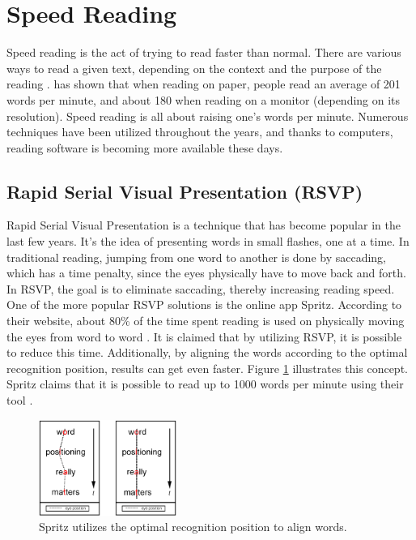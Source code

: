 \section{\fontsize{12}{15}\selectfont Speed Reading}
Speed reading is the act of trying to read faster than normal. There are various ways to read a given text, depending on the context and the purpose of the reading \cite{differentWaysOfReading}.  has shown that when reading on paper, people read an average of 201 words per minute, and about 180 when reading on a monitor (depending on its resolution). Speed reading is all about raising one's words per minute. Numerous techniques have been utilized throughout the years, and  thanks to computers, reading software is becoming more available these days.


\subsection{Rapid Serial Visual Presentation (RSVP)}
Rapid Serial Visual Presentation is a technique that has become popular in the last few years. It's the idea of presenting words in small flashes, one at a time. In traditional reading, jumping from one word to another is done by saccading, which has a time penalty, since the eyes physically have to move back and forth. In RSVP, the goal is to eliminate saccading, thereby increasing reading speed. One of the more popular RSVP solutions is the online app Spritz. According to their website, about 80\% of the time spent reading is used on physically moving the eyes from word to word \cite{spritz}.	It is claimed that by utilizing RSVP, it is possible to reduce this time. Additionally, by aligning the words according to the optimal recognition position, results can get even faster. Figure \ref{fig:spritz_orp} illustrates this concept. Spritz claims that it is possible to read up to 1000 words per minute using their tool \cite{spritz}.

\begin{figure}[htbp]
\centering
\includegraphics[width=0.4\textwidth]{Pics/opr_spritz}
\caption{Spritz utilizes the optimal recognition position to align words. \protect\cite{spritz}}
\label{fig:spritz_orp}
\end{figure}